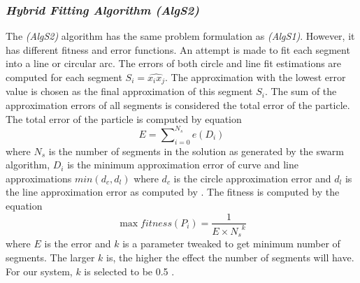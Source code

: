 \documentclass[preprint,10pt,5p,twocolumn]{elsarticle}
\begin{document}
 \subsubsection{\textit{Hybrid Fitting Algorithm \textsl{(AlgS2)}}}
The \textsl{(AlgS2)} algorithm has the same problem formulation as \textsl{(AlgS1)}. However, it has different fitness and error functions. An attempt is made to fit each segment into a line or circular arc. The errors of both circle and line fit estimations are computed for each segment $S_i=\widehat{x_ix_j}$. The approximation with the lowest error value is chosen as the final approximation of this segment $S_i$\cite{CruveDivisionSwarm}. The sum of the approximation errors of all segments is considered the total error of the particle. The total error of the particle is computed by equation %
 \begin{equation}
E=\sum\nolimits_{i = 0}^{N_s} e(D_i) 
\label{eq:errorSwarm2}
\end{equation}where $N_s$ is the number of segments in the solution as generated by the swarm algorithm, $D_i$ is the minimum approximation error of curve and line approximations $min(d_c,d_l)$ where $d_c$ is the circle approximation error and $d_l$ is the line approximation error as computed by \cite{CruveDivisionSwarm}.  The fitness is computed by the equation %
\begin{equation}
\max fitness(P_i ) = \frac{1}{{E \times {N_s}^k }}
\label{eq:fitnessSwarm2}%
\end{equation} where $E$ is the error and $k$ is a parameter tweaked to get minimum number of segments. The larger $k$ is, the higher the effect the number of segments will have. For our system, $k$ is selected to be 0.5 \cite{CruveDivisionSwarm}.
\end{document}
